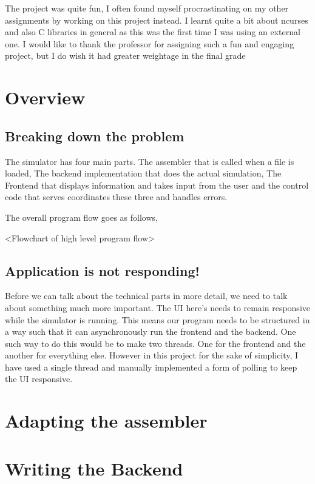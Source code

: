 \documentclass[12pt]{article}
\begin{document}
	The project was quite fun, I often found myself procrastinating on my other assignments by working on this project instead. I learnt quite a bit about ncurses and also C libraries in general as this was the first time I was using an external one. I would like to thank the professor for assigning such a fun and engaging project, but I do wish it had greater weightage in the final grade

	\section{Overview}

	\subsection{Breaking down the problem}

	The simulator has four main parts. The assembler that is called when a file is loaded, The backend implementation that does the actual simulation, The Frontend that displays information and takes input from the user and the control code that serves coordinates these three and handles errors.

	The overall program flow goes as follows,

	<Flowchart of high level program flow>

	\subsection{Application is not responding!}

	Before we can talk about the technical parts in more detail, we need to talk about something much more important. The UI here's needs to remain responsive while the simulator is running. This means our program needs to be structured in a way such that it can asynchronously run the frontend and the backend. One such way to do this would be to make two threads. One for the frontend and the another for everything else. However in this project for the sake of simplicity, I have used a single thread and manually implemented a form of polling to keep the UI responsive.

	\section{Adapting the assembler}

	

	\section{Writing the Backend}
	
\end{document}
